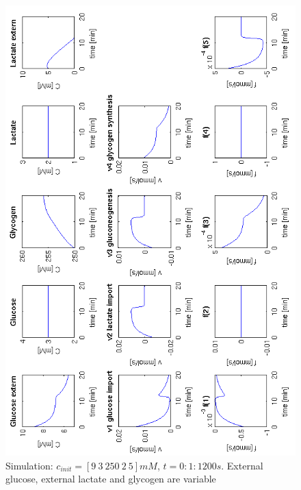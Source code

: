 \begin{figure}[htp]
 \centering
 \includegraphics[width=350pt,keepaspectratio=true]{./figures/mv4_sim1.png}
\caption{Simulation: $c_{init} = [9~3~250~2~5]mM$, $ t= 0:1:1200s$. External glucose, external lactate and glycogen are variable}
\label{fig: sim1}
\end{figure}
